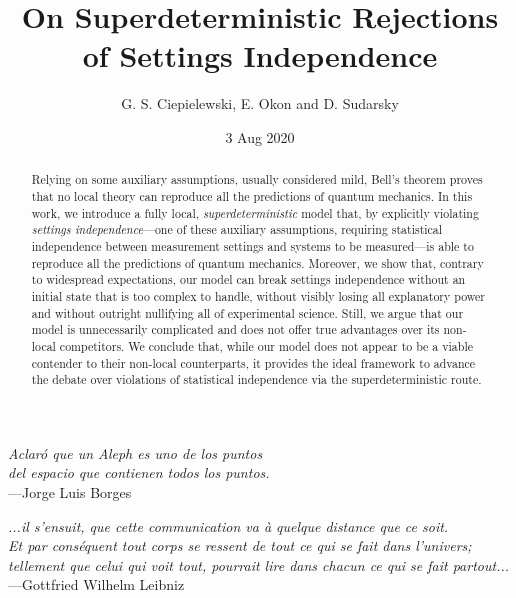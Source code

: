 \documentclass[letterpaper,12pt]{article}
\begin{document}
\title{On Superdeterministic Rejections of Settings Independence}
\author{G. S. Ciepielewski, E. Okon and D. Sudarsky}
\date{3 Aug 2020}

\maketitle

\begin{abstract}
Relying on some auxiliary assumptions, usually considered mild, Bell's theorem proves that no local theory can reproduce all the predictions of quantum mechanics. In this work, we introduce a fully local, \emph{superdeterministic} model that, by explicitly violating \emph{settings independence}---one of these auxiliary assumptions, requiring statistical independence between measurement settings and systems to be measured---is able to reproduce all the predictions of quantum mechanics. Moreover, we show that, contrary to widespread expectations, our model can break settings independence without an initial state that is too complex to handle, without visibly losing all explanatory power and without outright nullifying all of experimental science. Still, we argue that our model is unnecessarily complicated and does not offer true advantages over its non-local competitors. We conclude that, while our model does not appear to be a viable contender to their non-local counterparts, it provides the ideal framework to advance the debate over violations of statistical independence via the superdeterministic route.
\end{abstract}

\begin{flushright}
\textit{Aclar\'o que un Aleph es uno de los puntos \\ del espacio que contienen todos los puntos.}\\ ---Jorge Luis Borges
\end{flushright}

\begin{flushright}
\textit{...il s’ensuit, que cette communication va à quelque distance que ce soit. \\ Et par conséquent tout corps se ressent de tout ce qui se fait dans l’univers; \\ tellement que celui qui voit tout, pourrait lire dans chacun ce qui se fait partout...}\\ ---Gottfried Wilhelm Leibniz
\end{flushright}
\end{document}
